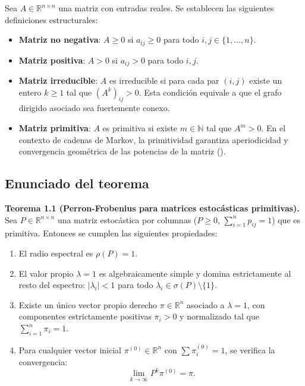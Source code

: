 \documentclass[
  spanish,
  us-letterpaper,
]{scrreprt}
\providecommand{\tightlist}{%
  \setlength{\itemsep}{0pt}\setlength{\parskip}{0pt}}
\numberwithin{equation}{section}
\begin{document}
Sea \(A \in \mathbb{R}^{n \times n}\) una matriz con entradas reales. Se
establecen las siguientes definiciones estructurales:

\begin{itemize}
\tightlist
\item
  \textbf{Matriz no negativa}: \(A \geq 0\) si \(a_{ij} \geq 0\) para
  todo \(i,j \in \{1,\dots,n\}\).
\item
  \textbf{Matriz positiva}: \(A > 0\) si \(a_{ij} > 0\) para todo
  \(i,j\).
\item
  \textbf{Matriz irreducible}: \(A\) es irreducible si para cada par
  \((i,j)\) existe un entero \(k \geq 1\) tal que \((A^k)_{ij} > 0\).
  Esta condición equivale a que el grafo dirigido asociado sea
  fuertemente conexo.
\item
  \textbf{Matriz primitiva}: \(A\) es primitiva si existe
  \(m \in \mathbb{N}\) tal que \(A^m > 0\). En el contexto de cadenas de
  Markov, la primitividad garantiza aperiodicidad y convergencia
  geométrica de las potencias de la matriz
  ().
\end{itemize}

\subsection{Enunciado del teorema}\label{sec-teroemafrobenius}

\textbf{Teorema 1.1 (Perron-Frobenius para matrices estocásticas
primitivas).} Sea \(P \in \mathbb{R}^{n \times n}\) una matriz
estocástica por columnas (\(P \geq 0\), \(\sum_{i=1}^n p_{ij} = 1\)) que
es primitiva. Entonces se cumplen las siguientes propiedades:

\begin{enumerate}
\def\labelenumi{\arabic{enumi}.}
\tightlist
\item
  El radio espectral es \(\rho(P) = 1\).
\item
  El valor propio \(\lambda = 1\) es algebraicamente simple y domina
  estrictamente al resto del espectro: \(|\lambda_i| < 1\) para todo
  \(\lambda_i \in \sigma(P) \setminus \{1\}\).
\item
  Existe un único vector propio derecho \(\pi \in \mathbb{R}^n\)
  asociado a \(\lambda = 1\), con componentes estrictamente positivas
  \(\pi_i > 0\) y normalizado tal que \(\sum_{i=1}^n \pi_i = 1\).
\item
  Para cualquier vector inicial \(\pi^{(0)} \in \mathbb{R}^n\) con
  \(\sum \pi_i^{(0)} = 1\), se verifica la convergencia: \[
  \lim_{k \to \infty} P^k \pi^{(0)} = \pi.
  \]
\end{enumerate}
\end{document}

